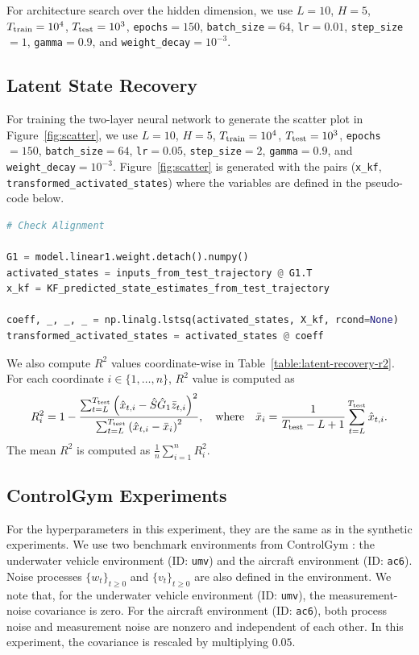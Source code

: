 \documentclass[11pt]{article}
\renewcommand{\cite}{\citep}
\newcommand{\<}{\langle}
\renewcommand{\>}{\rangle}
\numberwithin{equation}{section}
\begin{document}
For architecture search over the hidden dimension, we use $L=10$, $H=5$, $T_{\rm train} = 10^4$, $T_{\rm test} = 10^3$, \texttt{epochs}$=150$, \texttt{batch\_size}$=64$, \texttt{lr}$=0.01$, \texttt{step\_size}$=1$, \texttt{gamma}$=0.9$, and \texttt{weight\_decay}$=10^{-3}$.

\subsection{Latent State Recovery}

For training the two-layer neural network to generate the scatter plot in Figure~\ref{fig:scatter}, we use $L=10$, $H=5$, $T_{\rm train} = 10^4$, $T_{\rm test} = 10^3$, \texttt{epochs}$=150$, \texttt{batch\_size}$=64$, \texttt{lr}$=0.05$, \texttt{step\_size}$=2$, \texttt{gamma}$=0.9$, and \texttt{weight\_decay}$=10^{-3}$.
Figure~\ref{fig:scatter} is generated with the pairs (\texttt{x\_kf}, \texttt{transformed\_activated\_states}) where the variables are defined in the pseudo-code below.

\begin{lstlisting}[language=Python]
# Check Alignment

G1 = model.linear1.weight.detach().numpy()
activated_states = inputs_from_test_trajectory @ G1.T
x_kf = KF_predicted_state_estimates_from_test_trajectory

coeff, _, _, _ = np.linalg.lstsq(activated_states, X_kf, rcond=None)
transformed_activated_states = activated_states @ coeff
\end{lstlisting}

We also compute $R^2$ values coordinate-wise in Table~\ref{table:latent-recovery-r2}.
For each coordinate \(i\in\{1,\ldots,n\}\), $R^2$ value is computed as 
\begin{align*}
    R_i^2 = 1- \frac{\sum_{t=L}^{T_{\rm test}} \left( \hat x_{t,i} - \hat S\hat G_1 \bar z_{t,i} \right)^2}{\sum_{t=L}^{T_{\rm test}} \left( \hat x_{t,i} - \bar x_i \right)^2}, \quad\text{where}\quad 
    \bar x_i = \frac{1}{T_{\rm test}-L+1} \sum_{t=L}^{T_{\rm test}} \hat x_{t,i}.
\end{align*}
The mean $R^2$ is computed as $\frac{1}{n}\sum_{i=1}^n R_i^2$.


\subsection{ControlGym Experiments}

For the hyperparameters in this experiment, they are the same as in the synthetic experiments.
We use two benchmark environments from ControlGym \cite{zhang2024controlgym}: the underwater vehicle environment (ID: \texttt{umv}) and the aircraft environment (ID: \texttt{ac6}). 
Noise processes $\{w_t\}_{t\ge 0}$ and $\{v_t\}_{t \ge 0}$ are also defined in the environment. 
We note that, for the underwater vehicle environment (ID: \texttt{umv}), the measurement-noise covariance is zero. 
For the aircraft environment (ID: \texttt{ac6}), both process noise and measurement noise are nonzero and independent of each other.
In this experiment, the covariance is rescaled by multiplying $0.05$.


\end{document}
